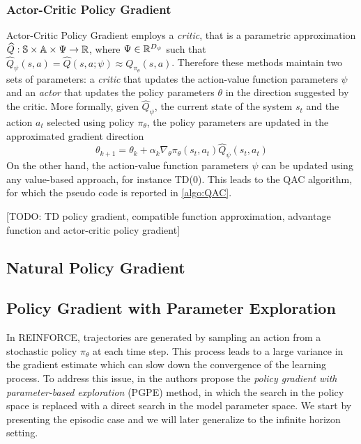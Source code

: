 \subsubsection{Actor-Critic Policy Gradient}
Actor-Critic Policy Gradient employs a \emph{critic}, that is a parametric
approximation $\widehat{Q}: \mathbb{S} \times \mathbb{A} \times \Psi \to \mathbb{R}$, where $\Psi \in
\mathbb{R}^{D_\psi}$ such that $\widehat{Q}_\psi(s, a) = \widehat{Q}(s, a; \psi)
\approx Q_{\pi_\theta}(s,a)$. Therefore these methods maintain two sets of
parameters: a \emph{critic} that updates the action-value function parameters
$\psi$ and an \emph{actor} that updates the policy parameters $\theta$ in the
direction suggested by the critic. More formally, given $\widehat{Q}_\psi$, the
current state of the system $s_t$ and the action $a_t$ selected using policy
$\pi_\theta$, the policy parameters are updated in the approximated gradient 
direction
\begin{equation}
	\theta_{k+1} = \theta_k + \alpha_k \nabla_\theta \pi_\theta(s_t, a_t) 
	\widehat{Q}_\psi(s_t, a_t) 
\end{equation}
On the other hand, the action-value function parameters $\psi$ can be updated
using any value-based approach, for instance TD(0). This leads to the QAC
algorithm, for which the pseudo code is reported in \ref{algo:QAC}.

[TODO: TD policy gradient,
compatible function approximation, advantage function and actor-critic policy
gradient]

\subsection{Natural Policy Gradient}

\subsection{Policy Gradient with Parameter Exploration}
In REINFORCE, trajectories are generated by sampling an action from a
stochastic policy $\pi_\theta$ at each time step. This process leads to a large
variance in the gradient estimate which can slow down the convergence of the
learning process. To address this issue, in \cite{sehnke2008policy} the authors
propose the \emph{policy gradient with parameter-based exploration} (PGPE) 
method, in which the search in the policy space is replaced with a direct search 
in the model parameter space. We start by presenting the episodic case and we
will later generalize to the infinite horizon setting.  

